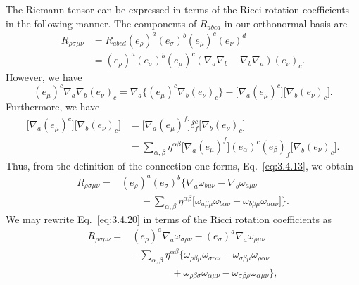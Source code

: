 The Riemann tensor can be expressed in terms of the Ricci rotation coefficients
in the following manner. The components of $R_{abcd}$ in our orthonormal basis are
\begin{equation}
  \begin{aligned}
    R_{\rho\sigma\mu\nu}
    &=R_{abcd}(e_\rho)^a(e_\sigma)^b(e_\mu)^c(e_\nu)^d\\
    &=(e_\rho)^a(e_\sigma)^b(e_\mu)^c
    (\nabla_a\nabla_b-\nabla_b\nabla_a)(e_\nu)_c.
  \end{aligned}
  \tag{3.4.17}\label{eq:3.4.17}
\end{equation}
However, we have
\begin{equation}
  (e_\mu)^c\nabla_a\nabla_b(e_\nu)_c
  =\nabla_a\bigl\{(e_\mu)^c\nabla_b(e_\nu)_c\bigr\}
  -\bigl[\nabla_a(e_\mu)^c\bigr]\bigl[\nabla_b(e_\nu)_c\bigr].
  \tag{3.4.18}\label{eq:3.4.18}
\end{equation}
Furthermore, we have
\begin{equation}
  \begin{aligned}
    \bigl[\nabla_a(e_\mu)^c\bigr]\bigl[\nabla_b(e_\nu)_c\bigr]
    &={}\bigl[\nabla_a(e_\mu)^f\bigr]\delta^c_f
    \bigl[\nabla_b(e_\nu)_c\bigr]\\
    &={}\sum_{\alpha,\beta}\eta^{\alpha\beta}
    \bigl[\nabla_a(e_\mu)^f\bigr](e_\alpha)^c(e_\beta)_f
    \bigl[\nabla_b(e_\nu)_c\bigr].
  \end{aligned}
  \tag{3.4.19}\label{eq:3.4.19}
\end{equation}
Thus, from the definition of the connection one forms, Eq.~\eqref{eq:3.4.13}, we obtain
\begin{equation}
  \begin{aligned}
    R_{\rho\sigma\mu\nu}
    ={}&(e_\rho)^a(e_\sigma)^b\biggl\{
    \nabla_a\omega_{b\mu\nu}-\nabla_b\omega_{a\mu\nu}\\
    &\qquad-\sum_{\alpha,\beta}\eta^{\alpha\beta}
    \bigl[\omega_{a\beta\mu}\omega_{b\alpha\nu}
    -\omega_{b\beta\mu}\omega_{a\alpha\nu}\bigr]\biggr\}.
  \end{aligned}
  \tag{3.4.20}\label{eq:3.4.20}
\end{equation}
We may rewrite Eq.~\eqref{eq:3.4.20} in terms of the Ricci rotation coefficients as
\begin{equation}
  \begin{aligned}
    R_{\rho\sigma\mu\nu}
    ={}&(e_\rho)^a\nabla_a\omega_{\sigma\mu\nu}
    -(e_\sigma)^a\nabla_a\omega_{\rho\mu\nu}\\
    &-\sum_{\alpha,\beta}\eta^{\alpha\beta}\bigl\{
    \omega_{\rho\beta\mu}\omega_{\sigma\alpha\nu}
    -\omega_{\sigma\beta\mu}\omega_{\rho\alpha\nu}\\
    &\qquad\qquad+\omega_{\rho\beta\sigma}\omega_{\alpha\mu\nu}
    -\omega_{\sigma\beta\rho}\omega_{\alpha\mu\nu}\bigr\},
  \end{aligned}
  \tag{3.4.21}\label{eq:3.4.21}
\end{equation}
